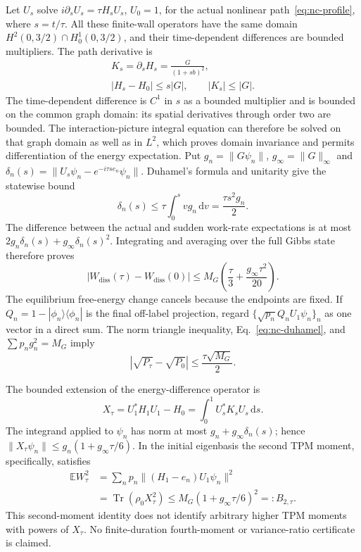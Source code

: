 \documentclass[aps,pra,reprint,superscriptaddress,longbibliography]{revtex4-2}
\newcommand{\dd}{\mathrm d}
\newcommand{\Tr}{\operatorname{Tr}}
\newcommand{\Wd}{W_{\mathrm{diss}}}
\newcommand{\E}{\mathbb E}
\begin{document}
Let $U_s$ solve $i\partial_sU_s=\tau H_sU_s$, $U_0=1$, for the
actual nonlinear path~\eqref{eq:nc-profile}, where $s=t/\tau$.
All these finite-wall operators have the same domain
$H^2(0,3/2)\cap H_0^1(0,3/2)$, and their time-dependent differences
are bounded multipliers.  The path derivative is
\begin{equation}
 \begin{gathered}
 K_s=\partial_sH_s=\frac{G}{(1+sb)^2},\\
 |H_s-H_0|\le s|G|,\qquad |K_s|\le|G|.
 \end{gathered}
 \label{eq:nc-path-derivative}
\end{equation}
The time-dependent difference is $C^1$ in $s$ as a bounded multiplier
and is bounded on the common graph domain: its spatial derivatives
through order two are bounded.  The interaction-picture integral
equation can therefore be solved on that graph domain as well as in
$L^2$, which proves domain invariance and permits differentiation of
the energy expectation.
Put $g_n=\|G\psi_n\|$, $g_\infty=\|G\|_\infty$ and
$\delta_n(s)=\|U_s\psi_n-e^{-i\tau s e_n}\psi_n\|$.
Duhamel's formula and unitarity give the statewise bound
\begin{equation}
 \delta_n(s)\le\tau\int_0^s v g_n\,\dd v
                    =\frac{\tau s^2g_n}{2}.
 \label{eq:nc-duhamel}
\end{equation}
The difference between the actual and sudden work-rate expectations is
at most $2g_n\delta_n(s)+g_\infty\delta_n(s)^2$.
Integrating and averaging over the full Gibbs state therefore proves
\begin{equation}
 |\Wd(\tau)-\Wd(0)|
 \le M_G\left(\frac{\tau}{3}
                    +\frac{g_\infty\tau^2}{20}\right).
 \label{eq:nc-work-bridge}
\end{equation}
The equilibrium free-energy change cancels because the endpoints are
fixed.  If $Q_n=1-|\phi_n\rangle\langle\phi_n|$ is the final
off-label projection, regard
$\{\sqrt{p_n}Q_nU_1\psi_n\}_n$ as one vector in a direct sum.
The norm triangle inequality, Eq.~\eqref{eq:nc-duhamel}, and
$\sum p_ng_n^2=M_G$ imply
\begin{equation}
 |\sqrt{P_\tau}-\sqrt{P_0}|\le\frac{\tau\sqrt{M_G}}2.
 \label{eq:nc-probability-bridge}
\end{equation}

The bounded extension of the energy-difference operator is
\begin{equation}
 X_\tau=U_1^*H_1U_1-H_0
              =\int_0^1U_s^*K_sU_s\,\dd s.
 \label{eq:nc-energy-difference}
\end{equation}
The integrand applied to $\psi_n$ has norm at most
$g_n+g_\infty\delta_n(s)$; hence
$\|X_\tau\psi_n\|\le g_n(1+g_\infty\tau/6)$.
In the initial eigenbasis the second TPM moment, specifically, satisfies
\begin{align}
 \E W_\tau^2
 &=\sum_n p_n\|(H_1-e_n)U_1\psi_n\|^2\nonumber\\
 &=\Tr(\rho_0X_\tau^2)
 \le M_G(1+g_\infty\tau/6)^2=:B_{2,\tau}.
 \label{eq:nc-finite-second}
\end{align}
This second-moment identity does not identify arbitrary higher TPM
moments with powers of $X_\tau$.  No finite-duration fourth-moment
or variance-ratio certificate is claimed.
\end{document}
